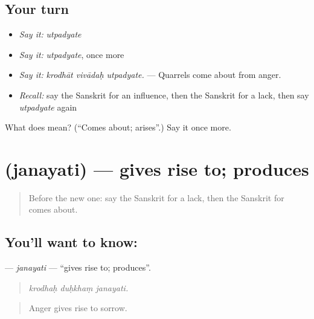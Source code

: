 \subsection*{Your turn}
\begin{itemize}
\raggedright
  \item \emph{Say it:} \emph{utpadyate}
  \item \emph{Say it:} \emph{utpadyate}, once more
  \item \emph{Say it:} \emph{krodhāt vivādaḥ utpadyate.} — Quarrels come about from anger.
  \item \emph{Recall:} say the Sanskrit for an influence, then the Sanskrit for a lack, then say \emph{utpadyate} again
\end{itemize}

\begin{tcolorbox}[breakable,colback=teal!4,colframe=teal!35!black,title={Before you move on}]
What does  mean? (\textquotedblleft{}Comes about; arises\textquotedblright{}.) Say it once more.
\end{tcolorbox}
\section[\texorpdfstring{\sk{जनयति} (janayati)}{जनयति (janayati)}]{ (janayati) — gives rise to; produces}

\label{lesson:SA-C340-janayati}



\begin{quote}
Before the new one: say the Sanskrit for a lack, then the Sanskrit for comes about.
\end{quote}

\subsection*{You'll want to know: }
\textbf{} — \emph{janayati} — \textquotedblleft{}gives rise to; produces\textquotedblright{}.

\begin{quote}
  
\end{quote}

\begin{quote}
\emph{krodhaḥ duḥkhaṃ janayati.}
\end{quote}

\begin{quote}
Anger gives rise to sorrow.
\end{quote}

